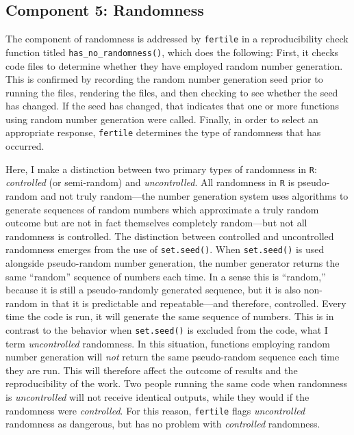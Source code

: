 \documentclass[12pt,twoside]{reedthesis}
\begin{document}
\hypertarget{component-5-randomness}{%
\subsection{Component 5: Randomness}\label{component-5-randomness}}

The component of randomness is addressed by \texttt{fertile} in a reproducibility check function titled \texttt{has\_no\_randomness()}, which does the following: First, it checks code files to determine whether they have employed random number generation. This is confirmed by recording the random number generation seed prior to running the files, rendering the files, and then checking to see whether the seed has changed. If the seed has changed, that indicates that one or more functions using random number generation were called. Finally, in order to select an appropriate response, \texttt{fertile} determines the type of randomness that has occurred.

Here, I make a distinction between two primary types of randomness in \texttt{R}: \emph{controlled} (or semi-random) and \emph{uncontrolled}. All randomness in \texttt{R} is pseudo-random and not truly random---the number generation system uses algorithms to generate sequences of random numbers which approximate a truly random outcome but are not in fact themselves completely random---but not all randomness is controlled. The distinction between controlled and uncontrolled randomness emerges from the use of \texttt{set.seed()}. When \texttt{set.seed()} is used alongside pseudo-random number generation, the number generator returns the same ``random'' sequence of numbers each time. In a sense this is ``random,'' because it is still a pseudo-randomly generated sequence, but it is also non-random in that it is predictable and repeatable---and therefore, controlled. Every time the code is run, it will generate the same sequence of numbers. This is in contrast to the behavior when \texttt{set.seed()} is excluded from the code, what I term \emph{uncontrolled} randomness. In this situation, functions employing random number generation will \emph{not} return the same pseudo-random sequence each time they are run. This will therefore affect the outcome of results and the reproducibility of the work. Two people running the same code when randomness is \emph{uncontrolled} will not receive identical outputs, while they would if the randomness were \emph{controlled}. For this reason, \texttt{fertile} flags \emph{uncontrolled} randomness as dangerous, but has no problem with \emph{controlled} randomness.
\end{document}
